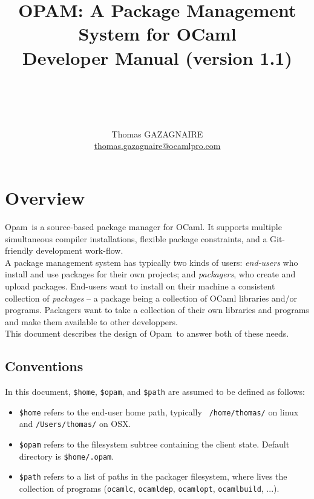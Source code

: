 \documentclass[a4paper,10pt]{article}
\title{
OPAM: A Package Management System for OCaml\\
Developer Manual (version 1.1)\\ ~\ \\
~\ \\}
\author{Thomas GAZAGNAIRE\\
\url{thomas.gazagnaire@ocamlpro.com}\\
}
\begin{document}
\newcommand{\OPAM}{{\sc Opam}}

\maketitle

\vfill

\tableofcontents

\section*{Overview}

\OPAM\ is a source-based package manager for OCaml. It supports multiple
simultaneous compiler installations, flexible package constraints, and
a Git-friendly development work-flow.\\

A package management system has typically two kinds of users: {\em
  end-users} who install and use packages for their own projects; and
{\em packagers}, who create and upload packages. End-users want to
install on their machine a consistent collection of {\em packages} --
a package being a collection of OCaml libraries and/or programs.
Packagers want to take a collection of their own libraries and
programs and make them available to other developpers.\\

This document describes the design of \OPAM\ to answer both of these needs.

\subsection*{Conventions}

In this document, \verb+$home+, \verb+$opam+, and
\verb+$path+ are assumed to be defined as follows:

\begin{itemize}

\item {\tt \$home} refers to the end-user home path, typically {\tt
  /home/thomas/} on linux and {\tt /Users/thomas/} on OSX.

\item {\tt \$opam} refers to the filesystem subtree containing the
  client state. Default directory is {\tt \$home/.opam}.

\item {\tt \$path} refers to a list of paths in the packager filesystem, where
  lives the collection of programs ({\tt ocamlc}, {\tt ocamldep}, {\tt ocamlopt},
  {\tt ocamlbuild}, ...).

\end{itemize}
\end{document}
